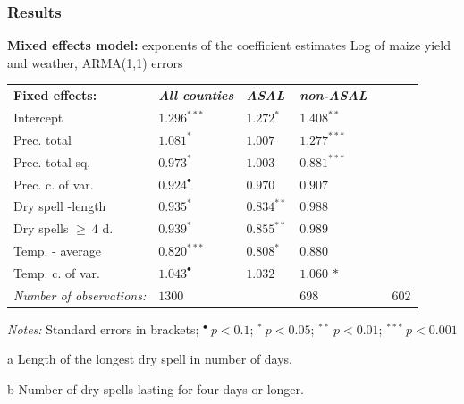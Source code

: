 \documentclass{beamer}              %
\begin{document}
\begin{frame}

\frametitle{Results}\label{Results} 
{\begin{threeparttable}
\caption{\normalsize{\textbf{ {Mixed  effects model:}} exponents of the coefficient estimates Log of maize yield and weather, ARMA(1,1) errors}}
\label{KenARe11_exponents} 
\begin{tabular}{@{}lllllll} 
 \\
  \textbf{Fixed effects:}&\textit{\textbf{All counties}}&\textit{\textbf{ASAL}}&\textit{\textbf{non-ASAL}}\\
\vspace{-0.2cm}Intercept&$1.296^{***}$&$1.272^{*}$&$1.408^{**}$\\
 \vspace{-0.2cm}Prec. total&$1.081^{*}$&$1.007^{}$&$1.277^{***}$\\
  \vspace{-0.2cm}Prec. total sq.&$0.973^{*}$&$1.003$&$0.881^{***}$\\
 \vspace{-0.2cm}Prec. c. of var.&$0.924^{\bullet}$&$0.970$ &$0.907^{}$\\
 \vspace{-0.2cm}Dry spell -length\tnote{a}&$0.935^{*}$&$0.834^{**}$&$ 0.988^{}$\\
 \vspace{-0.2cm}Dry spells $\geq~4$ d.\tnote{b}&$0.939^{*}$&$0.855^{**}$&$0.989^{}$\\
 \vspace{-0.2cm}Temp. - average&$0.820^{***}$&$0.808^{*}$&$0.880$ $^{}$\\
 \vspace{-0.2cm}Temp. c. of var.&$1.043^{\bullet}$&$1.032$&$1.060$ ${*}$\\
  \hline
\textit{Number of observations:}  &\multicolumn{2}{l}{$1300$}&\multicolumn{2}{l}{$698$}&\multicolumn{2}{l}{$602$}
\\
\end{tabular} 
 \begin{tablenotes}
  \begin{footnotesize}
    \item \textit{Notes:} Standard errors in brackets; \hfill $^{\bullet}~p<0.1$; $^{*}~p<0.05$; $^{**}~p<0.01$; $^{***}~p<0.001$
            \begin{adjustwidth}{1cm}{} 
  \item[a] Length of the longest dry spell in number of days.
    \item[b] Number of dry spells lasting for four days or longer. 
     \end{adjustwidth}
  \end{footnotesize}
\end{tablenotes}
  \end{threeparttable}\par }
\end{frame}
\end{document}
